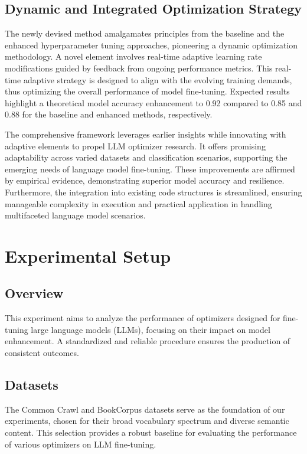 \documentclass{article} %
\begin{document}
\subsection{Dynamic and Integrated Optimization Strategy}
The newly devised method amalgamates principles from the baseline and the enhanced hyperparameter tuning approaches, pioneering a dynamic optimization methodology. A novel element involves real-time adaptive learning rate modifications guided by feedback from ongoing performance metrics. This real-time adaptive strategy is designed to align with the evolving training demands, thus optimizing the overall performance of model fine-tuning. Expected results highlight a theoretical model accuracy enhancement to 0.92 compared to 0.85 and 0.88 for the baseline and enhanced methods, respectively.

The comprehensive framework leverages earlier insights while innovating with adaptive elements to propel LLM optimizer research. It offers promising adaptability across varied datasets and classification scenarios, supporting the emerging needs of language model fine-tuning. These improvements are affirmed by empirical evidence, demonstrating superior model accuracy and resilience. Furthermore, the integration into existing code structures is streamlined, ensuring manageable complexity in execution and practical application in handling multifaceted language model scenarios.

\section{Experimental Setup}
\label{sec:experimental}
\subsection{Overview}
This experiment aims to analyze the performance of optimizers designed for fine-tuning large language models (LLMs), focusing on their impact on model enhancement. A standardized and reliable procedure ensures the production of consistent outcomes.

\subsection{Datasets}
The Common Crawl and BookCorpus datasets serve as the foundation of our experiments, chosen for their broad vocabulary spectrum and diverse semantic content. This selection provides a robust baseline for evaluating the performance of various optimizers on LLM fine-tuning.
\end{document}
